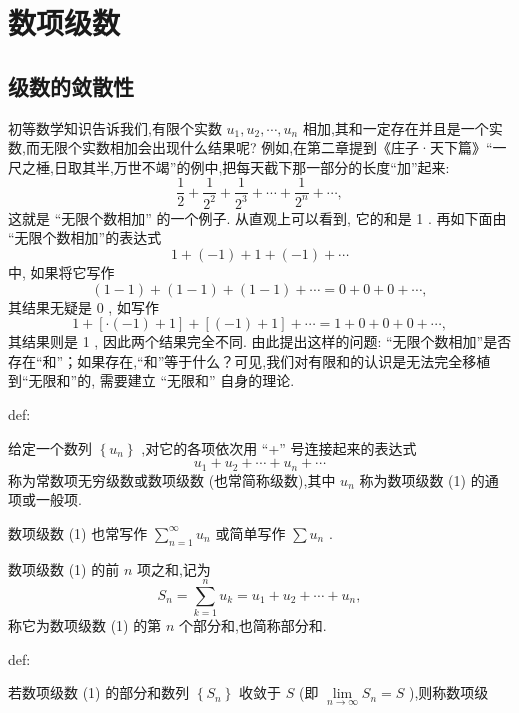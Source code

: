 \chapter{数项级数}

\section{级数的敛散性}

初等数学知识告诉我们,有限个实数 \({u}_{1},{u}_{2},\cdots ,{u}_{n}\) 相加,其和一定存在并且是一个实数,而无限个实数相加会出现什么结果呢? 例如,在第二章提到《庄子·天下篇》“一尺之棰,日取其半,万世不竭”的例中,把每天截下那一部分的长度“加”起来:
\[
\frac{1}{2} + \frac{1}{{2}^{2}} + \frac{1}{{2}^{3}} + \cdots  + \frac{1}{{2}^{n}} + \cdots ,
\]
这就是 “无限个数相加” 的一个例子. 从直观上可以看到, 它的和是 1 . 再如下面由 “无限个数相加”的表达式
\[
1 + \left( {-1}\right)  + 1 + \left( {-1}\right)  + \cdots
\]
中, 如果将它写作
\[
\left( {1 - 1}\right)  + \left( {1 - 1}\right)  + \left( {1 - 1}\right)  + \cdots  = 0 + 0 + 0 + \cdots ,
\]
其结果无疑是 0 , 如写作
\[
1 + \left\lbrack  {\cdot \left( {-1}\right)  + 1}\right\rbrack   + \left\lbrack  {\left( {-1}\right)  + 1}\right\rbrack   + \cdots  = 1 + 0 + 0 + 0 + \cdots ,
\]
其结果则是 1 , 因此两个结果完全不同. 由此提出这样的问题: “无限个数相加”是否存在“和”；如果存在,“和”等于什么？可见,我们对有限和的认识是无法完全移植到“无限和”的, 需要建立 “无限和” 自身的理论.

\begin{definition}{}{def:}

\end{definition}
给定一个数列 \(\left\{  {u}_{n}\right\}\) ,对它的各项依次用 “+” 号连接起来的表达式
\[
{u}_{1} + {u}_{2} + \cdots  + {u}_{n} + \cdots  \tag{1}
\]
称为常数项无穷级数或数项级数 (也常简称级数),其中 \({u}_{n}\) 称为数项级数 (1) 的通项或一般项.

数项级数 (1) 也常写作 \(\mathop{\sum }\limits_{{n = 1}}^{\infty }{u}_{n}\) 或简单写作 \(\sum {u}_{n}\) .

数项级数 (1) 的前 \(n\) 项之和,记为
\[
{S}_{n} = \mathop{\sum }\limits_{{k = 1}}^{n}{u}_{k} = {u}_{1} + {u}_{2} + \cdots  + {u}_{n}, \tag{2}
\]
称它为数项级数 (1) 的第 \(n\) 个部分和,也简称部分和.

\begin{definition}{}{def:}

\end{definition}
若数项级数 (1) 的部分和数列 \(\left\{  {S}_{n}\right\}\) 收敛于 \(S\) (即 \(\mathop{\lim }\limits_{{n \rightarrow  \infty }}{S}_{n} = S\) ),则称数项级

